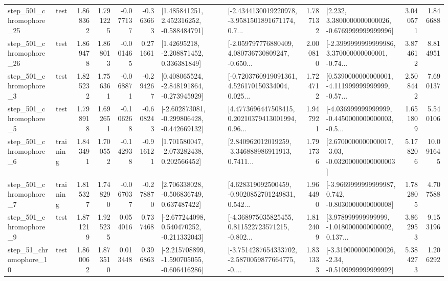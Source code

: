 \begin{tabular}{llrrrrllrlrr}
  step\_501\_chromophore\_25 &      test &      1.868362 &    1.791225 &     -0.077137 & -0.363663 &    [1.485841251, 2.452316252, -0.588484791] &  [-2.4344130019220978, -3.9581501891671174, 0.7... &       1.787132 &   [2.232, 3.3800000000000026, -0.6769999999999996] &            3.040571 &          1.846688 \\
  step\_501\_chromophore\_26 &      test &      1.869478 &    1.868013 &     -0.001465 &  0.271661 &     [1.42695218, -2.208871452, 0.336381849] &  [-2.059797776880409, 4.080736730809247, -0.650... &       2.000810 &  [-2.3999999999999986, 3.370000000000001, -0.74... &            3.874612 &          8.814951 \\
   step\_501\_chromophore\_3 &      test &      1.825232 &    1.756361 &     -0.068871 & -0.294267 &   [0.408065524, -2.848191864, -0.273945929] &  [-0.7203760919091361, 4.526170150334004, 0.025... &       1.724712 &  [0.5390000000000001, -4.111999999999999, -0.57... &            2.508442 &          7.690137 \\
   step\_501\_chromophore\_5 &      test &      1.798918 &    1.692651 &     -0.106268 & -0.608243 &  [-2.602873081, -0.299806428, -0.442669132] &  [4.4773696447508415, 0.20210379413001994, 0.96... &       1.947921 &  [-4.036999999999999, -0.4450000000000003, -0.5... &            1.651809 &          5.540106 \\
   step\_501\_chromophore\_6 &  training &      1.843491 &    1.700552 &     -0.142938 & -0.916121 &    [1.701580047, -2.073282438, 0.202566452] &  [2.840962012019259, -3.346888986911913, 0.7411... &       1.791736 &  [2.6700000000000017, -3.03, -0.03200000000000003] &            5.178206 &         10.091645 \\
   step\_501\_chromophore\_7 &  training &      1.815327 &    1.748290 &     -0.067037 & -0.278870 &    [2.706338028, -0.506836749, 0.637487422] &  [4.628319092500459, -0.9020852701249831, 0.542... &       1.964490 &  [-3.9669999999999987, 0.742, -0.8030000000000008] &            1.782805 &          4.707588 \\
   step\_501\_chromophore\_9 &      test &      1.871219 &    1.925235 &      0.054016 &  0.737468 &   [-2.677244098, 0.540470252, -0.211332043] &  [-4.368975035825455, 0.811522723571215, -0.802... &       1.812409 &  [3.978999999999999, -1.0180000000000002, 0.137... &            3.862953 &          9.153196 \\
   step\_51\_chromophore\_10 &      test &      1.860062 &    1.873510 &      0.013448 &  0.396863 &  [-2.215708899, -1.590705055, -0.606416286] &  [-3.7514287654333702, -2.5870059877664775, -0.... &       1.831333 &  [-3.3190000000000026, -2.34, -0.5109999999999992] &            5.384273 &          1.206292 \\

\end{tabular}
